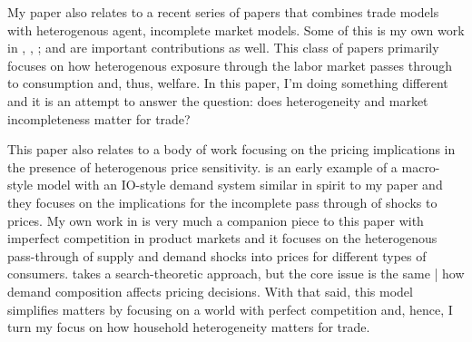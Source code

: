 \documentclass[12pt,pdftex]{article}
\begin{document}
\begin{onehalfspacing}
My paper also relates to a recent series of papers that combines trade models with heterogenous agent, incomplete market models. Some of this is my own work in \citet{lyon2018redistributing}, \citet{lyon2019}, \citet{waugh_consumption}; \citet*{gaston2018} and \citet{carroll2020heterogeneous} are important contributions as well. This class of papers primarily focuses on how heterogenous exposure through the labor market passes through to consumption and, thus, welfare. In this paper, I'm doing something different and it is an attempt to answer the question: does heterogeneity and market incompleteness matter for trade?

This paper also relates to a body of work focusing on the pricing implications in the presence of heterogenous price sensitivity. \citet{nakamura2010accounting} is an early example of a macro-style model with an IO-style demand system similar in spirit to my paper and they focuses on the implications for the incomplete pass through of shocks to prices. My own work in \citet{p-iq} is very much a companion piece to this paper with imperfect competition in product markets and it focuses on the heterogenous pass-through of supply and demand shocks into prices for different types of consumers. \citet{nord2022shopping} takes a search-theoretic approach, but the core issue is the same | how demand composition affects pricing decisions. With that said, this model simplifies matters by focusing on a world with perfect competition and, hence, I turn my focus on how household heterogeneity matters for trade.






%
%
%
%
%
%
%
%




%


\end{onehalfspacing}
\end{document}
